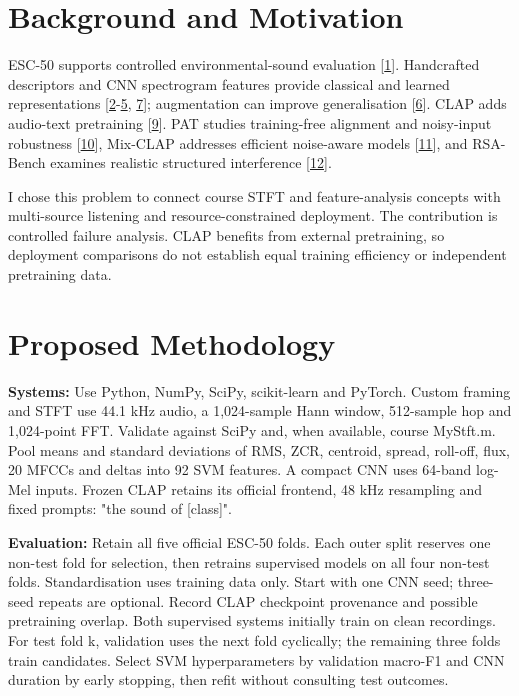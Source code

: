 \documentclass[a4paper,11pt]{article}
\begin{document}
\section{Background and Motivation}

ESC-50 supports controlled environmental-sound evaluation [\hyperref[ref:1]{1}]. Handcrafted descriptors and CNN spectrogram features provide classical and learned representations [\hyperref[ref:2]{2}-\hyperref[ref:5]{5}, \hyperref[ref:7]{7}]; augmentation can improve generalisation [\hyperref[ref:6]{6}]. CLAP adds audio-text pretraining [\hyperref[ref:9]{9}]. PAT studies training-free alignment and noisy-input robustness [\hyperref[ref:10]{10}], Mix-CLAP addresses efficient noise-aware models [\hyperref[ref:11]{11}], and RSA-Bench examines realistic structured interference [\hyperref[ref:12]{12}].

I chose this problem to connect course STFT and feature-analysis concepts with multi-source listening and resource-constrained deployment. The contribution is controlled failure analysis. CLAP benefits from external pretraining, so deployment comparisons do not establish equal training efficiency or independent pretraining data.

\section{Proposed Methodology}

\textbf{Systems:} Use Python, NumPy, SciPy, scikit-learn and PyTorch. Custom framing and STFT use 44.1 kHz audio, a 1,024-sample Hann window, 512-sample hop and 1,024-point FFT. Validate against SciPy and, when available, course MyStft.m. Pool means and standard deviations of RMS, ZCR, centroid, spread, roll-off, flux, 20 MFCCs and deltas into 92 SVM features. A compact CNN uses 64-band log-Mel inputs. Frozen CLAP retains its official frontend, 48 kHz resampling and fixed prompts: "the sound of [class]".

\textbf{Evaluation:} Retain all five official ESC-50 folds. Each outer split reserves one non-test fold for selection, then retrains supervised models on all four non-test folds. Standardisation uses training data only. Start with one CNN seed; three-seed repeats are optional. Record CLAP checkpoint provenance and possible pretraining overlap. Both supervised systems initially train on clean recordings. For test fold k, validation uses the next fold cyclically; the remaining three folds train candidates. Select SVM hyperparameters by validation macro-F1 and CNN duration by early stopping, then refit without consulting test outcomes.
\end{document}
